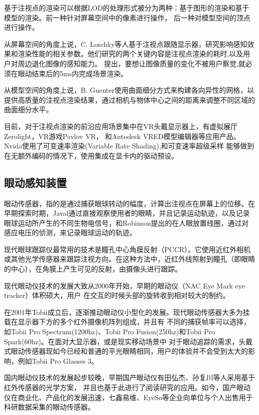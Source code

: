 \documentclass[]{ctexart}
\begin{document}
		基于注视点的渲染可以根据LOD的处理形式被分为两种：基于图形的渲染和基于模型的渲染。前一种针对屏幕空间中的像素进行操作，
		后一种对模型空间的顶点进行操作。\cite{1020335127.nh}
		
		从屏幕空间的角度上说，C. Loschky等人基于注视点跟随显示器，研究影响感知效果和渲染性能的相关参数。他们研究的两个关键内容是注视点渲染的耗时,以及用户对周边退化图像的感知能力\cite{10.1145/355017.355032}。 提出，要想让图像质量的变化不被用户察觉,就必须在眼动结束后的5ms内完成场景渲染。
		
		从模型空间的角度上说，B. Guenter使用曲面细分方式来构建各向异性的网格，以提供高质量的注视点渲染结果，通过相机与物体中心之间的距离来调整不同区域的曲面细分水平\cite{Guenter2012Foveated3G}。

		目前，对于注视点渲染的前沿应用场景集中在VR头戴显示器上，有虚拟展厅Zerolight，VR游戏Pavlov VR，
		和Autodesk VRED模型编辑器等应用产品。 Nvida使用了可变速率渲染(Variable Rate Shading)\cite{VRS},和可变速率超级采样 
		能够做到在无额外编码的情况下，使用集成在显卡内的驱动预设。
		
		\subsection{眼动感知装置}
		
		眼动传感器，指的是通过捕获眼球转动的幅度，计算出注视点在屏幕上的位移\cite{825279}。在早期探索时期，Javal通过直接观察使用者的眼睛，并且记录运动轨迹，以及记录眼球运动所产生的不同生物电信号，和Robinson\cite{4322822}提出的在人眼放置线圈，通过对感应电压的侦测，来记录眼球运动的轨迹。
		
		现代眼球跟踪仪最常用的技术是瞳孔中心角膜反射（PCCR）。它使用近红外相机或其他光学传感器来跟踪注视方向。在这种方法中，近红外线照射到瞳孔（即眼睛的中心），在角膜上产生可见的反射，由摄像头进行跟踪\cite{8122153}。
		
		现代眼动仪技术的发展大致从2000年开始，早期的眼动仪（NAC Eye Mark eye tracker）\cite{10.1145/91385.91449}体积硕大，用户
		在交互的时候头部的旋转收到相对较大的制约。
		
		在2001年Tobii成立后，逐渐推动眼动仪小型化的发展。现代眼动传感器大多为挂载在显示器下方的多个红外摄像机阵列组成，并且有
		不同的捕获帧率可以选择，如Tobii Pro Spectrum(1200hz)、Tobii Pro Fusion(250hz)和Tobii Pro Spark(60hz)。在面对大显示器，或是现实移动场景中
		对于眼动追踪的需求，头戴式眼动传感器现如今已经和普通的平光眼睛相同，用户的体验并不会受到太大的影响，例如Tobii Pro Glasses 3。
		
		国内眼动仪技术的发展起步较晚，早期国产眼动仪有田弘杰、孙复川等人采用基于红外传感器的光学方案\cite{YXNX200402010}\cite{SWGC198904009}，
		并且也基于此进行了阅读研究的应用。如今，国产眼动仪在商业化、产品化的发展迅速，七鑫易维、EyeSo等企业向单位与个人出售用于
		科研数据采集的眼动传感器。
		
\end{document}
